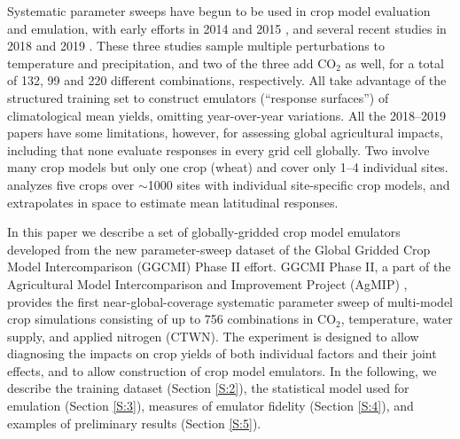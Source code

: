\documentclass[gmd, manuscript]{copernicus} %
\begin{document}
Systematic parameter sweeps have begun to be used in crop model evaluation and emulation, with early efforts in 2014 and 2015 \citep{ruane2014, Markowski2015, Pirttioja2015}, and several recent studies in 2018 and 2019 \citep{FRONZEK20182, RUIZRAMOS2018,Snyder2018}. 
These three studies sample multiple perturbations to temperature and precipitation, and two of the three add CO$_2$ as well, for a total of 132, 99 and 220 different combinations, respectively. 
All take advantage of the structured training set to construct emulators (``response surfaces'') of climatological mean yields, omitting year-over-year variations. 
All the 2018--2019 papers have some limitations, however, for assessing global agricultural impacts, including that
none evaluate responses in every grid cell globally.
Two involve many crop models but only one crop (wheat) \citep{FRONZEK20182,RUIZRAMOS2018} and cover only 1--4 individual sites. 
\citet{Snyder2018} analyzes five crops over $\sim$1000 sites with individual site-specific crop models, and extrapolates in space to estimate mean latitudinal responses. %

In this paper we describe a set of globally-gridded crop model emulators developed from the new parameter-sweep dataset of the Global Gridded Crop Model Intercomparison (GGCMI) Phase II effort. 
GGCMI Phase II, a part of the Agricultural Model Intercomparison and Improvement Project (AgMIP) \citep{ROSENZWEIG2013, Rosenzweig2014}, provides the first near-global-coverage systematic parameter sweep of multi-model crop simulations consisting of up to 756 combinations in CO$_2$, temperature, water supply, and applied nitrogen (CTWN). 
The experiment is designed to allow diagnosing the impacts on crop yields of both individual factors and their joint effects, and to allow construction of crop model emulators.
In the following, we describe the training dataset (Section \ref{S:2}), the statistical model used for emulation (Section \ref{S:3}), measures of emulator fidelity (Section \ref{S:4}), and examples of preliminary results (Section \ref{S:5}). 
\end{document}
